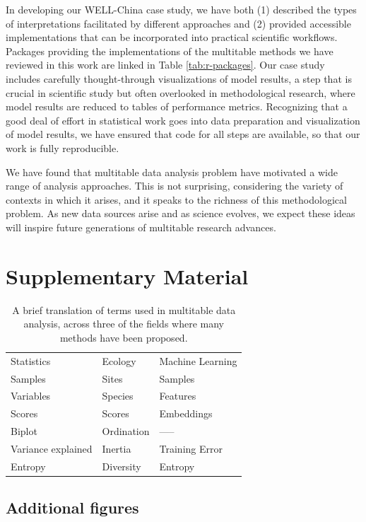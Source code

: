 \documentclass{article}
\begin{document}
In developing our WELL-China case study, we have both (1) described the types of
interpretations facilitated by different approaches and (2) provided accessible
implementations that can be incorporated into practical scientific workflows.
Packages providing the implementations of the multitable methods we have
reviewed in this work are linked in Table \ref{tab:r-packages}. Our case study
includes carefully thought-through visualizations of model results, a step that
is crucial in scientific study but often overlooked in methodological research,
where model results are reduced to tables of performance metrics. Recognizing
that a good deal of effort in statistical work goes into data preparation and
visualization of model results, we have ensured that code for all steps are
available, so that our work is fully reproducible.

We have found that multitable data analysis problem have motivated a wide range
of analysis approaches. This is not surprising, considering the variety of
contexts in which it arises, and it speaks to the richness of this
methodological problem. As new data sources arise and as science evolves, we
expect these ideas will inspire future generations of multitable research
advances.




\section{Supplementary Material}

\begin{table}
\centering
\begin{tabular}{lll}
Statistics & Ecology & Machine Learning \\
Samples & Sites & Samples \\
Variables & Species & Features \\
Scores & Scores & Embeddings \\
Biplot & Ordination & ----- \\
Variance explained & Inertia & Training Error \\
Entropy & Diversity & Entropy
\end{tabular}
\caption{A brief translation of terms used in multitable data analysis, across
  three of the fields where many methods have been proposed.}
\label{tab:multitable_translation}
\end{table}

\subsection{Additional figures}
\end{document}
